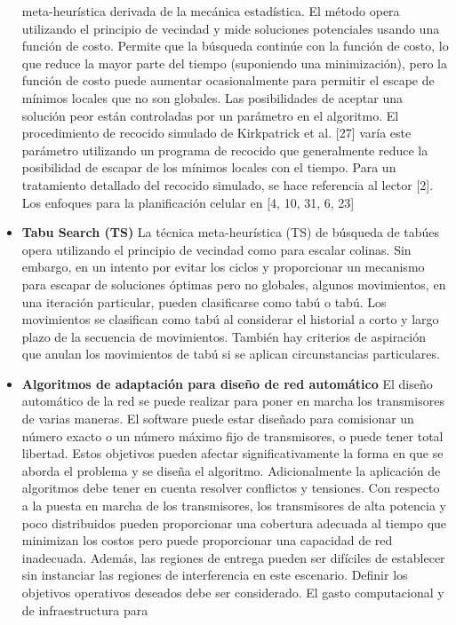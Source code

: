 \documentclass[]{article}
\begin{document}
\begin{itemize}
  meta-heurística derivada de la mecánica estadística. El método opera
  utilizando el principio de vecindad y mide soluciones potenciales
  usando una función de costo. Permite que la búsqueda continúe con la
  función de costo, lo que reduce la mayor parte del tiempo (suponiendo
  una minimización), pero la función de costo puede aumentar
  ocasionalmente para permitir el escape de mínimos locales que no son
  globales. Las posibilidades de aceptar una solución peor están
  controladas por un parámetro en el algoritmo. El procedimiento de
  recocido simulado de Kirkpatrick et al. {[}27{]} varía este parámetro
  utilizando un programa de recocido que generalmente reduce la
  posibilidad de escapar de los mínimos locales con el tiempo. Para un
  tratamiento detallado del recocido simulado, se hace referencia al
  lector {[}2{]}. Los enfoques para la planificación celular en {[}4,
  10, 31, 6, 23{]}
\item
  \textbf{Tabu Search (TS)} La técnica meta-heurística (TS) de búsqueda
  de tabúes opera utilizando el principio de vecindad como para escalar
  colinas. Sin embargo, en un intento por evitar los ciclos y
  proporcionar un mecanismo para escapar de soluciones óptimas pero no
  globales, algunos movimientos, en una iteración particular, pueden
  clasificarse como tabú o tabú. Los movimientos se clasifican como tabú
  al considerar el historial a corto y largo plazo de la secuencia de
  movimientos. También hay criterios de aspiración que anulan los
  movimientos de tabú si se aplican circunstancias particulares.
\item
  \textbf{Algoritmos de adaptación para diseño de red automático} El
  diseño automático de la red se puede realizar para poner en marcha los
  transmisores de varias maneras. El software puede estar diseñado para
  comisionar un número exacto o un número máximo fijo de transmisores, o
  puede tener total libertad. Estos objetivos pueden afectar
  significativamente la forma en que se aborda el problema y se diseña
  el algoritmo. Adicionalmente la aplicación de algoritmos debe tener en
  cuenta resolver conflictos y tensiones. Con respecto a la puesta en
  marcha de los transmisores, los transmisores de alta potencia y poco
  distribuidos pueden proporcionar una cobertura adecuada al tiempo que
  minimizan los costos pero puede proporcionar una capacidad de red
  inadecuada. Además, las regiones de entrega pueden ser difíciles de
  establecer sin instanciar las regiones de interferencia en este
  escenario. Definir los objetivos operativos deseados debe ser
  considerado. El gasto computacional y de infraestructura para

\end{itemize}
\end{document}
